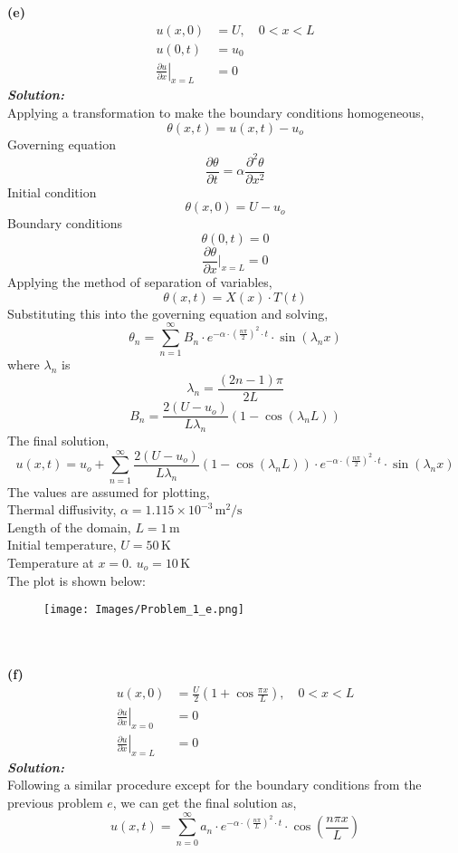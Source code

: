 \documentclass[]{article}
\theoremstyle{definition}
\begin{document}
\begin{enumerate}
\textbf{(e)}\quad
\begin{align*}
u(x,0) &= U, \quad 0 < x < L \\
u(0,t) &= u_0 \\
\left. \frac{\partial u}{\partial x} \right|_{x=L} &= 0
\end{align*}
\emph{\textbf{Solution:}}\\
Applying a transformation to make the boundary conditions homogeneous,
\[
\theta(x,t) = u(x,t) - u_o
\]
Governing equation
\[
\frac{\partial\theta}{\partial t} = \alpha \frac{\partial^2\theta}{\partial x^2}
\]
Initial condition
\[
\theta(x,0) = U - u_o
\]
Boundary conditions
\[
\theta(0,t) = 0
\]
\[
\frac{\partial \theta}{\partial x}\Big|_{x=L} = 0
\]
Applying the method of separation of variables,
\[
\theta(x,t) = X(x) \cdot T(t)
\]
Substituting this into the governing equation and solving,
\[
\boxed{
\theta_n = \sum_{n=1}^{\infty} B_n \cdot e^{-\alpha \cdot \left(\frac{n\pi}{2}\right)^2 \cdot t} \cdot \sin(\lambda_n x)
}
\]
where $\lambda_n$ is
\[
\boxed{
\lambda_n = \frac{(2n-1)\pi}{2L}
}
\]
\[
\boxed{
B_n = \frac{2(U-u_o)}{L\lambda_n}(1 - \cos(\lambda_n L))
}
\]
The final solution,
\[
\boxed{
u(x,t) = u_o + \sum_{n=1}^{\infty} \frac{2(U-u_o)}{L\lambda_n}(1 - \cos(\lambda_n L)) \cdot e^{-\alpha \cdot \left(\frac{n\pi}{2}\right)^2 \cdot t} \cdot \sin(\lambda_n x)
}
\]
The values are assumed for plotting, \\
Thermal diffusivity, $\alpha = 1.115 \times 10^{-3}\, \text{m}^2/\text{s}$ \\
Length of the domain, $L = 1\, \text{m}$ \\
Initial temperature, $U = 50\, \text{K}$ \\
Temperature at $x = 0$. $u_o = 10\, \text{K}$ \\
The plot is shown below:\\
\begin{figure}[htbp]
    \centering
    \texttt{[image: Images/Problem\_1\_e.png]}
\end{figure}\\
\\
\newpage
\textbf{(f)}\quad
\begin{align*}
u(x,0) &= \frac{U}{2} \left(1 + \cos \frac{\pi x}{L}\right), \quad 0 < x < L \\
\left. \frac{\partial u}{\partial x} \right|_{x=0} &= 0 \\
\left. \frac{\partial u}{\partial x} \right|_{x=L} &= 0
\end{align*}
\emph{\textbf{Solution:}}\\
Following a similar procedure except for the boundary conditions from the previous problem $e$,
we can get the final solution as,
\[
u(x,t) = \sum_{n=0}^{\infty} a_n \cdot e^{-\alpha \cdot \left(\frac{n\pi}{L}\right)^2 \cdot t} \cdot \cos\left(\frac{n\pi x}{L}\right)
\]


\end{enumerate}
\end{document}
